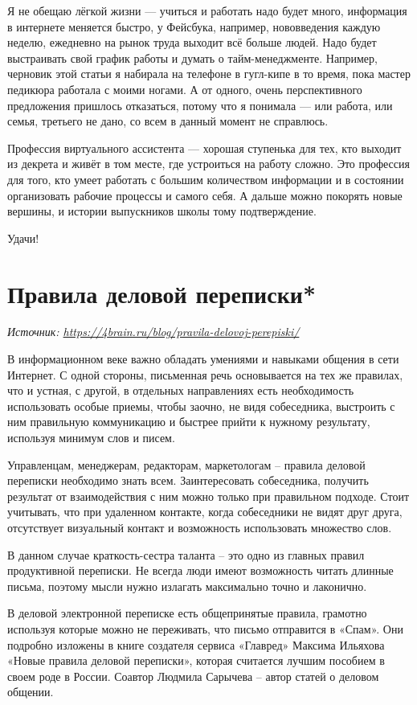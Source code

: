 Я не обещаю лёгкой жизни --- учиться и работать надо будет много, информация в интернете меняется быстро, у Фейсбука, например, нововведения каждую неделю, ежедневно на рынок труда выходит всё больше людей. Надо будет выстраивать свой график работы и думать о тайм-менеджменте. Например, черновик этой статьи я набирала на телефоне в гугл-кипе в то время, пока мастер педикюра работала с моими ногами. А от одного, очень перспективного предложения пришлось отказаться, потому что я понимала --- или работа, или семья, третьего не дано, со всем в данный момент не справлюсь.

Профессия виртуального ассистента --- хорошая ступенька для тех, кто выходит из декрета и живёт в том месте, где устроиться на работу сложно. Это профессия для того, кто умеет работать с большим количеством информации и в состоянии организовать рабочие процессы и самого себя. А дальше можно покорять новые вершины, и истории выпускников школы тому подтверждение.

Удачи!

\section{Правила деловой переписки*}

\textit{Источник: \url{https://4brain.ru/blog/pravila-delovoj-perepiski/}}

В информационном веке важно обладать умениями и навыками общения в сети Интернет. С одной стороны, письменная речь основывается на тех же правилах, что и устная, с другой, в отдельных направлениях есть необходимость использовать особые приемы, чтобы заочно, не видя собеседника, выстроить с ним правильную коммуникацию и быстрее прийти к нужному результату, используя минимум слов и писем.

Управленцам, менеджерам, редакторам, маркетологам – правила деловой переписки необходимо знать всем. Заинтересовать собеседника, получить результат от взаимодействия с ним можно только при правильном подходе. Стоит учитывать, что при удаленном контакте, когда собеседники не видят друг друга, отсутствует визуальный контакт и возможность использовать множество слов.

В данном случае краткость-сестра таланта – это одно из главных правил продуктивной переписки. Не всегда люди имеют возможность читать длинные письма, поэтому мысли нужно излагать максимально точно и лаконично.

В деловой электронной переписке есть общепринятые правила, грамотно используя которые можно не переживать, что письмо отправится в «Спам». Они подробно изложены в книге создателя сервиса «Главред» Максима Ильяхова «Новые правила деловой переписки», которая считается лучшим пособием в своем роде в России. Соавтор Людмила Сарычева – автор статей о деловом общении.

